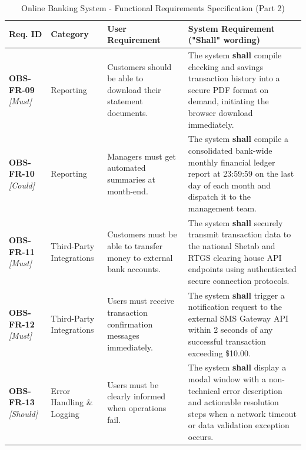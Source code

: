\documentclass[11pt,a4paper]{article}
\begin{document}
\begin{table}[H]
\centering
\caption{Online Banking System - Functional Requirements Specification (Part 2)}
\label{tab:functional_reqs_2}
\footnotesize
\singlespacing
\begin{tabular}{p{2.0cm} p{2.2cm} p{3.8cm} p{5.4cm}}
\toprule
\textbf{Req. ID} & \textbf{Category} & \textbf{User Requirement} & \textbf{System Requirement ("Shall" wording)} \\ \midrule

\textbf{OBS-FR-09} \newline \textit{\small [Must]} & Reporting & Customers should be able to download their statement documents. & The system \textbf{shall} compile checking and savings transaction history into a secure PDF format on demand, initiating the browser download immediately. \\ \midrule

\textbf{OBS-FR-10} \newline \textit{\small [Could]} & Reporting & Managers must get automated summaries at month-end. & The system \textbf{shall} compile a consolidated bank-wide monthly financial ledger report at 23:59:59 on the last day of each month and dispatch it to the management team. \\ \midrule

\textbf{OBS-FR-11} \newline \textit{\small [Must]} & Third-Party Integrations & Customers must be able to transfer money to external bank accounts. & The system \textbf{shall} securely transmit transaction data to the national Shetab and RTGS clearing house API endpoints using authenticated secure connection protocols. \\ \midrule

\textbf{OBS-FR-12} \newline \textit{\small [Must]} & Third-Party Integrations & Users must receive transaction confirmation messages immediately. & The system \textbf{shall} trigger a notification request to the external SMS Gateway API within 2 seconds of any successful transaction exceeding \$10.00. \\ \midrule

\textbf{OBS-FR-13} \newline \textit{\small [Should]} & Error Handling \& Logging & Users must be clearly informed when operations fail. & The system \textbf{shall} display a modal window with a non-technical error description and actionable resolution steps when a network timeout or data validation exception occurs. \\ \midrule


\end{tabular}
\end{table}
\end{document}
